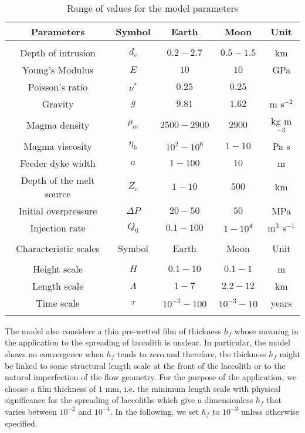 \begin{table}[h!]
  \caption{Range of values for the model parameters}
  \centering
  \begin{tabular}{c|c|c|c|c}
    Parameters& Symbol & Earth & Moon&Unit\\
    \hline
              &&&&\\
    Depth of intrusion & $d_c$ & $0.2-2.7$ &$0.5-1.5$ &km \\
    Young's Modulus & $E$ & $10$ &$10$ &GPa \\
    Poisson's ratio & $\nu^*$ & $0.25$ &$0.25$ &\\
    Gravity & $g$ & $9.81$ &$1.62$&m s$^{-2}$ \\
    Magma density & $\rho_{m}$ & $2500-2900$ &$2900$&kg m$^{-3}$ \\
    Magma viscosity & $\eta_h $ & $10^2-10^{6}$ &$1-10$&Pa s \\
    Feeder dyke width & $a$ & $1-100$ &$10$&m \\
    Depth of the melt source & $Z_{c}$ & $ 1-10$&$ 500$& km \\ 
    Initial overpressure & $\Delta P$ & $20-50$ &$50$ &MPa \\
    Injection rate & $Q_{0}$ &$0.1-100$ &$1-10^4$&m$^{3}$ s$^{-1}$ \\
              &&&&\\
    \hline
    Characteristic scales & Symbol & Earth & Moon&Unit\\
    \hline
              &&&&\\
    Height scale & $H$& $0.1-10$ &$0.1-1$ &m \\
    Length scale & $\Lambda$ & $1-7$&$2.2-12$& km \\
    Time scale & $\tau$ & $10^{-3}-100$&$10^{-3}-10$& years \\
    \label{C2-tab2}
  \end{tabular} 
\end{table}

The model  also considers  a thin pre-wetted  film of  thickness $h_f$
whose  meaning in  the application  to the  spreading of  laccolith is
unclear.  In  particular, the  model shows  no convergence  when $h_f$
tends to zero \citep{Lister:2013ia} and therefore, the thickness $h_f$
might be  linked to some structural  length scale at the  front of the
laccolith or  to the natural  imperfection of the flow  geometry.  For
the purpose of the application, we  choose a film thickness of $1$ mm,
i.e.   the minimum  length scale  with physical  significance for  the
spreading of laccoliths  which give a dimensionless  $h_f$ that varies
between $10^{-2}$  and $10^{-4}$.  In  the following, we set  $h_f$ to
$10^{-3}$ unless otherwise specified.

